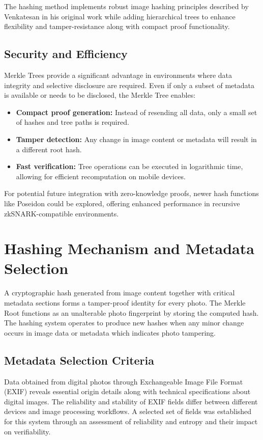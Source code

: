 The hashing method implements robust image hashing principles described by Venkatesan \cite{robustImageHashing} in his original work while adding hierarchical trees to enhance flexibility and tamper-resistance along with compact proof functionality.

\subsection{Security and Efficiency}
Merkle Trees provide a significant advantage in environments where data integrity and selective disclosure are required. Even if only a subset of metadata is available or needs to be disclosed, the Merkle Tree enables:
\begin{itemize}
    \item {\textbf{Compact proof generation:}} Instead of resending all data, only a small set of hashes and tree paths is required.
    \item {\textbf{Tamper detection:}} Any change in image content or metadata will result in a different root hash.
    \item {\textbf{Fast verification:}} Tree operations can be executed in logarithmic time, allowing for efficient recomputation on mobile devices.
\end{itemize}
For potential future integration with zero-knowledge proofs, newer hash functions like Poseidon \cite{poseidon} could be explored, offering enhanced performance in recursive zkSNARK-compatible environments.

\section{Hashing Mechanism and Metadata Selection}
A cryptographic hash generated from image content together with critical metadata sections forms a tamper-proof identity for every photo. The Merkle Root functions as an unalterable photo fingerprint by storing the computed hash. The hashing system operates to produce new hashes when any minor change occurs in image data or metadata which indicates photo tampering.

\subsection{Metadata Selection Criteria}
Data obtained from digital photos through Exchangeable Image File Format (EXIF) reveals essential origin details along with technical specifications about digital images. The reliability and stability of EXIF fields differ between different devices and image processing workflows. A selected set of fields was established for this system through an assessment of reliability and entropy and their impact on verifiability.

